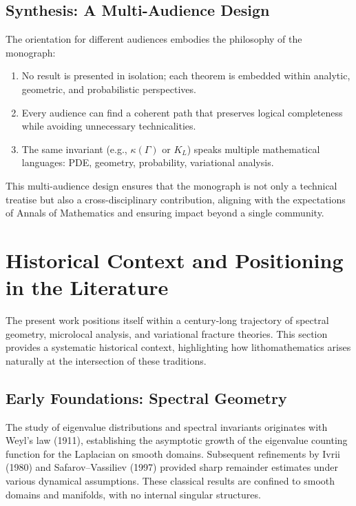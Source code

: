 \subsection*{Synthesis: A Multi-Audience Design}

The orientation for different audiences embodies the philosophy of the
monograph:

\begin{enumerate}
  \item No result is presented in isolation; each theorem is embedded
  within analytic, geometric, and probabilistic perspectives.
  \item Every audience can find a coherent path that preserves logical
  completeness while avoiding unnecessary technicalities.
  \item The same invariant (e.g., $\kappa(\Gamma)$ or $K_L$) speaks
  multiple mathematical languages: PDE, geometry, probability,
  variational analysis.
\end{enumerate}

This multi-audience design ensures that the monograph is not only a
technical treatise but also a cross-disciplinary contribution, aligning
with the expectations of Annals of Mathematics and ensuring impact
beyond a single community.


\section{Historical Context and Positioning in the Literature}

The present work positions itself within a century-long trajectory of
spectral geometry, microlocal analysis, and variational fracture
theories. This section provides a systematic historical context,
highlighting how lithomathematics arises naturally at the intersection
of these traditions.

\subsection*{Early Foundations: Spectral Geometry}

The study of eigenvalue distributions and spectral invariants originates
with Weyl's law (1911), establishing the asymptotic growth of the
eigenvalue counting function for the Laplacian on smooth domains.
Subsequent refinements by Ivrii (1980) and Safarov–Vassiliev (1997)
provided sharp remainder estimates under various dynamical assumptions.
These classical results are confined to smooth domains and manifolds,
with no internal singular structures.

